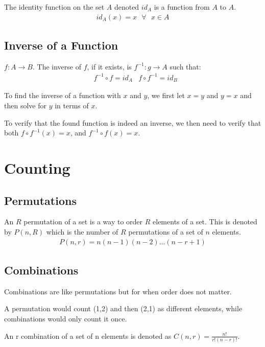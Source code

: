 \documentclass[12pt,letterpaper]{article} \usepackage{amsmath} \usepackage{graphicx}  \usepackage{longtable}  \usepackage{amssymb}
\begin{document}
        The identity function on the set $A$ denoted $id_A$ is a function from $A$ to $A$.
        \begin{align*}
            id_A (x) = x \text{ } \forall \text{ } x\in A
        \end{align*}

        \subsection{Inverse of a Function}
        $f: A\to B$. The inverse of $f$, if it exists, is $f^{-1}: g\to A$ such that:
        \begin{align*}
            &f^{-1} \circ f = id_A &f\circ f^{-1} = id_B
        \end{align*}

        To find the inverse of a function with $x$ and $y$, we first let $x=y$ and $y=x$ and then solve for $y$ in terms of $x$.

        To verify that the found function is indeed an inverse, we then need to verify that both $f\circ f^{-1} (x) = x$, and $f^{-1} \circ f(x) = x$.

    \section{Counting}

        \subsection{Permutations}
        An $R$ permutation of a set is a way to order $R$ elements of a set. This is denoted by $P(n,R)$ which is the number of $R$ permutations of a set of $n$ elements.
        \begin{align*}
            P(n,r) = n(n-1)(n-2)...(n-r+1)
        \end{align*}

        \subsection{Combinations}
        Combinations are like permutations but for when order does not matter. 

        A permutation would count (1,2) and then (2,1) as different elements, while combinations would only count it once. 

        An r combination of a set of n elements is denoted as $C(n,r) = \frac{n!}{r!(n-r)!}$.
        
\end{document}
